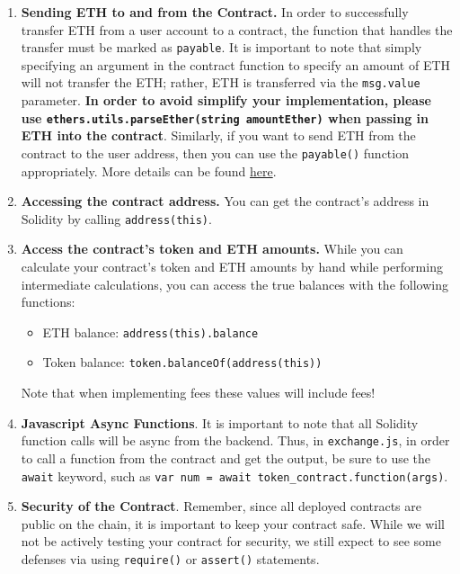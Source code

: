 \documentclass[11pt]{article}
\begin{document}
\begin{enumerate}
    \item \textbf{Sending ETH to and from the Contract.} In order to successfully transfer ETH from a user account to a contract, the function that handles the transfer must be marked as \texttt{payable}. It is important to note that simply specifying an argument in the contract function to specify an amount of ETH will not transfer the ETH; rather, ETH is transferred via the \texttt{msg.value} parameter. \textbf{In order to avoid simplify your implementation, please use \texttt{ethers.utils.parseEther(string amountEther)} when passing in ETH into the contract}. Similarly, if you want to send ETH from the contract to the user address, then you can use the \texttt{payable()} function appropriately. More details can be found \hyperlink{https://solidity-by-example.org/payable/}{here}.
    
    \item \textbf{Accessing the contract address.} You can get the contract's address in Solidity by calling \texttt{address(this)}.
    
    \item \textbf{Access the contract's token and ETH amounts.} While you can calculate your contract's token and ETH amounts by hand while performing intermediate calculations, you can access the true balances with the following functions:
    \begin{itemize}
        \item ETH balance: \texttt{address(this).balance}
        \item Token balance: \texttt{token.balanceOf(address(this))}
    \end{itemize}
    Note that when implementing fees these values will include fees!
    
    \item \textbf{Javascript Async Functions}. It is important to note that all Solidity function calls will be async from the backend. Thus, in \texttt{exchange.js}, in order to call a function from the contract and get the output, be sure to use the \texttt{await} keyword, such as \texttt{var num = await token\_contract.function(args)}.
    
    \item \textbf{Security of the Contract}. Remember, since all deployed contracts are public on the chain, it is important to keep your contract safe. While we will not be actively testing your contract for security, we still expect to see some defenses via using \texttt{require()} or \texttt{assert()} statements. 


\end{enumerate}
\end{document}
